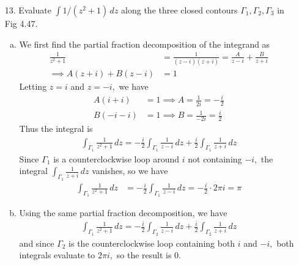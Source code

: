 \documentclass{article}
\begin{document}
\begin{itemize}
	\item[13.] Evaluate $\int 1/(z^2+1)\, dz$ along the three closed contours $\Gamma_1, \Gamma_2, \Gamma_3$ in Fig 4.47.
		\begin{enumerate}[(a)]
			\item 
				\begin{soln}
					We first find the partial fraction decomposition of the integrand as
					\begin{align*}
						\frac{1}{z^2+1} &= \frac{1}{(z-i)(z+i)} = \frac{A}{z-i} + \frac{B}{z+i} \\
						\implies A(z+i) + B(z-i) &= 1 
					\end{align*}
					Letting $z=i$ and $z=-i,$ we have
					\begin{align*}
						A(i+i) &= 1 \implies A = \frac{1}{2i} = -\frac{i}{2} \\
						B(-i-i) &= 1 \implies B = \frac{1}{-2i} = \frac{i}{2}
					\end{align*}
					Thus the integral is 
					\begin{align*}
						\int_{\Gamma_1} \frac{1}{z^2+1}\, dz = -\frac{i}{2}\int_{\Gamma_1} \frac{1}{z-i}\, dz + \frac{i}{2}\int_{\Gamma_1}  \frac{1}{z+i}\, dz
					\end{align*}
					Since $\Gamma_1$ is a counterclockwise loop around $i$ not containing $-i,$ the integral $\int_{\Gamma_1} \frac{1}{z+i}\, dz$ vanishes, so we have
					\begin{align*}
						\int_{\Gamma_1}\frac{1}{z^2+1}\, dz &= -\frac{i}{2}\int_{\Gamma_1} \frac{1}{z-i}\, dz =-\frac{i}{2}\cdot 2\pi i = \pi
					\end{align*}
				\end{soln}

			\item 
				\begin{soln}
					Using the same partial fraction decomposition, we have
					\begin{align*}
						\int_{\Gamma_1} \frac{1}{z^2+1}\, dz = -\frac{i}{2}\int_{\Gamma_2} \frac{1}{z-i}\, dz + \frac{i}{2}\int_{\Gamma_2}\frac{1}{z+i}\, dz
					\end{align*}
					and since $\Gamma_2$ is the counterclockwise loop containing both $i$ and $-i,$ both integrals evaluate to $2\pi i,$ so the result is 0.
				\end{soln}


\end{enumerate}
\end{itemize}
\end{document}
